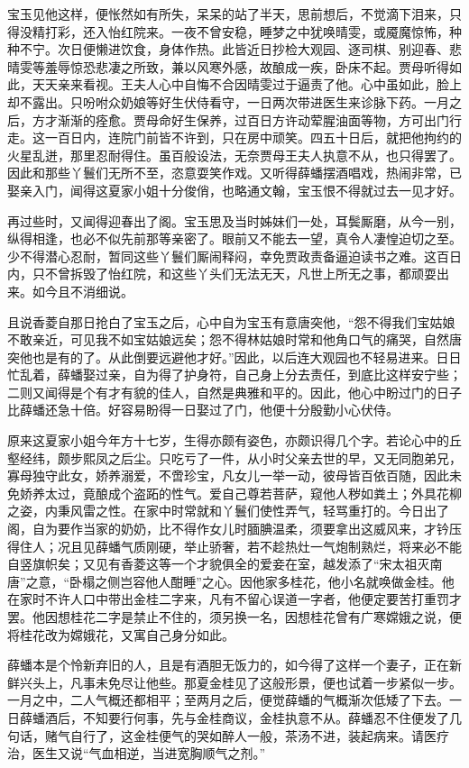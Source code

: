 宝玉见他这样，便怅然如有所失，呆呆的站了半天，思前想后，不觉滴下泪来，只得没精打彩，还入怡红院来。一夜不曾安稳，睡梦之中犹唤晴雯，或魇魔惊怖，种种不宁。次日便懒进饮食，身体作热。此皆近日抄检大观园、逐司棋、别迎春、悲晴雯等羞辱惊恐悲凄之所致，兼以风寒外感，故酿成一疾，卧床不起。贾母听得如此，天天亲来看视。王夫人心中自悔不合因晴雯过于逼责了他。心中虽如此，脸上却不露出。只吩咐众奶娘等好生伏侍看守，一日两次带进医生来诊脉下药。一月之后，方才渐渐的痊愈。贾母命好生保养，过百日方许动荤腥油面等物，方可出门行走。这一百日内，连院门前皆不许到，只在房中顽笑。四五十日后，就把他拘约的火星乱迸，那里忍耐得住。虽百般设法，无奈贾母王夫人执意不从，也只得罢了。因此和那些丫鬟们无所不至，恣意耍笑作戏。又听得薛蟠摆酒唱戏，热闹非常，已娶亲入门，闻得这夏家小姐十分俊俏，也略通文翰，宝玉恨不得就过去一见才好。

再过些时，又闻得迎春出了阁。宝玉思及当时姊妹们一处，耳鬓厮磨，从今一别，纵得相逢，也必不似先前那等亲密了。眼前又不能去一望，真令人凄惶迫切之至。少不得潜心忍耐，暂同这些丫鬟们厮闹释闷，幸免贾政责备逼迫读书之难。这百日内，只不曾拆毁了怡红院，和这些丫头们无法无天，凡世上所无之事，都顽耍出来。如今且不消细说。

且说香菱自那日抢白了宝玉之后，心中自为宝玉有意唐突他，``怨不得我们宝姑娘不敢亲近，可见我不如宝姑娘远矣；怨不得林姑娘时常和他角口气的痛哭，自然唐突他也是有的了。从此倒要远避他才好。''因此，以后连大观园也不轻易进来。日日忙乱着，薛蟠娶过亲，自为得了护身符，自己身上分去责任，到底比这样安宁些；二则又闻得是个有才有貌的佳人，自然是典雅和平的。因此，他心中盼过门的日子比薛蟠还急十倍。好容易盼得一日娶过了门，他便十分殷勤小心伏侍。

原来这夏家小姐今年方十七岁，生得亦颇有姿色，亦颇识得几个字。若论心中的丘壑经纬，颇步熙凤之后尘。只吃亏了一件，从小时父亲去世的早，又无同胞弟兄，寡母独守此女，娇养溺爱，不啻珍宝，凡女儿一举一动，彼母皆百依百随，因此未免娇养太过，竟酿成个盗跖的性气。爱自己尊若菩萨，窥他人秽如粪土；外具花柳之姿，内秉风雷之性。在家中时常就和丫鬟们使性弄气，轻骂重打的。今日出了阁，自为要作当家的奶奶，比不得作女儿时腼腆温柔，须要拿出这威风来，才钤压得住人；况且见薛蟠气质刚硬，举止骄奢，若不趁热灶一气炮制熟烂，将来必不能自竖旗帜矣；又见有香菱这等一个才貌俱全的爱妾在室，越发添了``宋太祖灭南唐''之意，``卧榻之侧岂容他人酣睡''之心。因他家多桂花，他小名就唤做金桂。他在家时不许人口中带出金桂二字来，凡有不留心误道一字者，他便定要苦打重罚才罢。他因想桂花二字是禁止不住的，须另换一名，因想桂花曾有广寒嫦娥之说，便将桂花改为嫦娥花，又寓自己身分如此。

薛蟠本是个怜新弃旧的人，且是有酒胆无饭力的，如今得了这样一个妻子，正在新鲜兴头上，凡事未免尽让他些。那夏金桂见了这般形景，便也试着一步紧似一步。一月之中，二人气概还都相平；至两月之后，便觉薛蟠的气概渐次低矮了下去。一日薛蟠酒后，不知要行何事，先与金桂商议，金桂执意不从。薛蟠忍不住便发了几句话，赌气自行了，这金桂便气的哭如醉人一般，茶汤不进，装起病来。请医疗治，医生又说``气血相逆，当进宽胸顺气之剂。''

